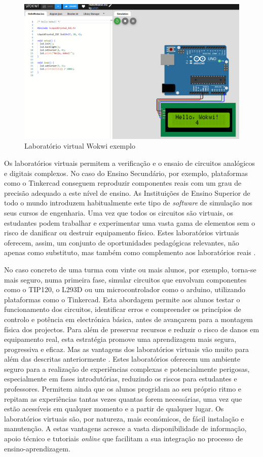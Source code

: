 \begin{figure}[hbtp]
    \centering
    \includegraphics[width=0.6\linewidth]{figures/wokwi.png}
    \caption{Laboratório virtual Wokwi exemplo}
    \label{fig:wokwi}
\end{figure}

Os laboratórios virtuais permitem a verificação e o ensaio de circuitos analógicos e digitais complexos. No caso do Ensino Secundário, por exemplo, plataformas como o Tinkercad conseguem reproduzir componentes reais com um grau de precisão adequado a este nível de ensino. As Instituições de Ensino Superior de todo o mundo introduzem habitualmente este tipo de \textit{software} de simulação nos seus cursos de engenharia. Uma vez que todos os circuitos são virtuais, os estudantes podem trabalhar e experimentar uma vasta gama de elementos sem o risco de danificar ou destruir equipamento físico. Estes laboratórios virtuais oferecem, assim, um conjunto de oportunidades pedagógicas relevantes, não apenas como substituto, mas também como complemento aos laboratórios reais \cite{WebBrowserSimulators}. 

No caso concreto de uma turma com vinte ou mais alunos, por exemplo, torna-se mais seguro, numa primeira fase, simular circuitos que envolvam componentes como o TIP120, o L293D ou um microcontrolador como o \gls{arduino}, utilizando plataformas como o Tinkercad. Esta abordagem permite aos alunos testar o funcionamento dos circuitos, identificar erros e compreender os princípios de controlo e potência em electrónica básica, antes de avançarem para a montagem física dos projectos. Para além de preservar recursos e reduzir o risco de danos em equipamento real, esta estratégia promove uma aprendizagem mais segura, progressiva e eficaz. Mas as vantagens dos laboratórios virtuais vão muito para além das descritas anteriormente \cite{scheckler, lynch, BlogeMas95, vabtegensVL}. Estes laboratórios oferecem um ambiente seguro para a realização de experiências complexas e potencialmente perigosas, especialmente em fases introdutórias, reduzindo os riscos para estudantes e professores. Permitem ainda que os alunos progridam ao seu próprio ritmo e repitam as experiências tantas vezes quantas forem necessárias, uma vez que estão acessíveis em qualquer momento e a partir de qualquer lugar. Os laboratórios virtuais são, por natureza, mais económicos, de fácil instalação e manutenção. A estas vantagens acresce a vasta disponibilidade de informação, apoio técnico e tutoriais \textit{online} que facilitam a sua integração no processo de ensino-aprendizagem.

